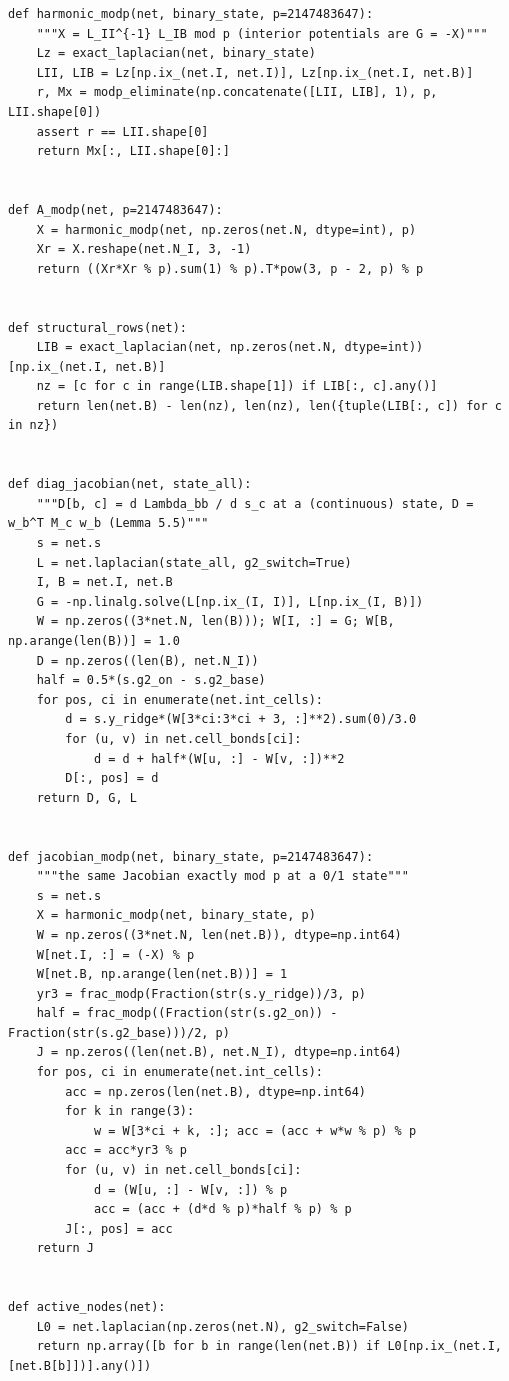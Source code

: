 \documentclass[11pt,a4paper]{article}
\theoremstyle{definition}
\theoremstyle{remark}
\begin{document}
\begin{lstlisting}
def harmonic_modp(net, binary_state, p=2147483647):
    """X = L_II^{-1} L_IB mod p (interior potentials are G = -X)"""
    Lz = exact_laplacian(net, binary_state)
    LII, LIB = Lz[np.ix_(net.I, net.I)], Lz[np.ix_(net.I, net.B)]
    r, Mx = modp_eliminate(np.concatenate([LII, LIB], 1), p, LII.shape[0])
    assert r == LII.shape[0]
    return Mx[:, LII.shape[0]:]


def A_modp(net, p=2147483647):
    X = harmonic_modp(net, np.zeros(net.N, dtype=int), p)
    Xr = X.reshape(net.N_I, 3, -1)
    return ((Xr*Xr % p).sum(1) % p).T*pow(3, p - 2, p) % p


def structural_rows(net):
    LIB = exact_laplacian(net, np.zeros(net.N, dtype=int))[np.ix_(net.I, net.B)]
    nz = [c for c in range(LIB.shape[1]) if LIB[:, c].any()]
    return len(net.B) - len(nz), len(nz), len({tuple(LIB[:, c]) for c in nz})


def diag_jacobian(net, state_all):
    """D[b, c] = d Lambda_bb / d s_c at a (continuous) state, D = w_b^T M_c w_b (Lemma 5.5)"""
    s = net.s
    L = net.laplacian(state_all, g2_switch=True)
    I, B = net.I, net.B
    G = -np.linalg.solve(L[np.ix_(I, I)], L[np.ix_(I, B)])
    W = np.zeros((3*net.N, len(B))); W[I, :] = G; W[B, np.arange(len(B))] = 1.0
    D = np.zeros((len(B), net.N_I))
    half = 0.5*(s.g2_on - s.g2_base)
    for pos, ci in enumerate(net.int_cells):
        d = s.y_ridge*(W[3*ci:3*ci + 3, :]**2).sum(0)/3.0
        for (u, v) in net.cell_bonds[ci]:
            d = d + half*(W[u, :] - W[v, :])**2
        D[:, pos] = d
    return D, G, L


def jacobian_modp(net, binary_state, p=2147483647):
    """the same Jacobian exactly mod p at a 0/1 state"""
    s = net.s
    X = harmonic_modp(net, binary_state, p)
    W = np.zeros((3*net.N, len(net.B)), dtype=np.int64)
    W[net.I, :] = (-X) % p
    W[net.B, np.arange(len(net.B))] = 1
    yr3 = frac_modp(Fraction(str(s.y_ridge))/3, p)
    half = frac_modp((Fraction(str(s.g2_on)) - Fraction(str(s.g2_base)))/2, p)
    J = np.zeros((len(net.B), net.N_I), dtype=np.int64)
    for pos, ci in enumerate(net.int_cells):
        acc = np.zeros(len(net.B), dtype=np.int64)
        for k in range(3):
            w = W[3*ci + k, :]; acc = (acc + w*w % p) % p
        acc = acc*yr3 % p
        for (u, v) in net.cell_bonds[ci]:
            d = (W[u, :] - W[v, :]) % p
            acc = (acc + (d*d % p)*half % p) % p
        J[:, pos] = acc
    return J


def active_nodes(net):
    L0 = net.laplacian(np.zeros(net.N), g2_switch=False)
    return np.array([b for b in range(len(net.B)) if L0[np.ix_(net.I, [net.B[b]])].any()])



\end{lstlisting}
\end{document}
